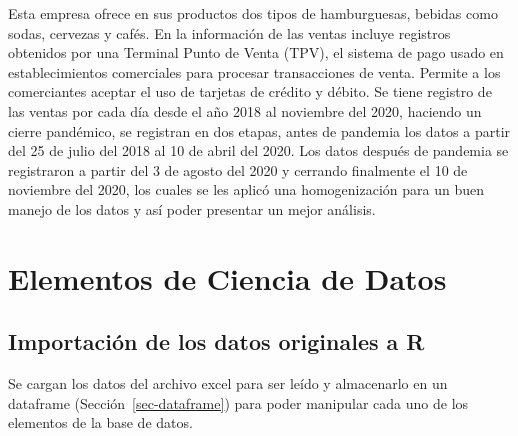 \documentclass[
  us-letterpaper,
]{scrreprt}
\theoremstyle{plain}
\theoremstyle{plain}
\theoremstyle{definition}
\theoremstyle{remark}
\begin{document}
Esta empresa ofrece en sus productos dos tipos de hamburguesas, bebidas
como sodas, cervezas y cafés. En la información de las ventas incluye
registros obtenidos por una Terminal Punto de Venta (TPV), el sistema de
pago usado en establecimientos comerciales para procesar transacciones
de venta. Permite a los comerciantes aceptar el uso de tarjetas de
crédito y débito. Se tiene registro de las ventas por cada día desde el
año 2018 al noviembre del 2020, haciendo un cierre pandémico, se
registran en dos etapas, antes de pandemia los datos a partir del 25 de
julio del 2018 al 10 de abril del 2020. Los datos después de pandemia se
registraron a partir del 3 de agosto del 2020 y cerrando finalmente el
10 de noviembre del 2020, los cuales se les aplicó una homogenización
para un buen manejo de los datos y así poder presentar un mejor
análisis.

\section{Elementos de Ciencia de
Datos}\label{elementos-de-ciencia-de-datos}

\subsection{Importación de los datos originales a
R}\label{importaciuxf3n-de-los-datos-originales-a-r}

Se cargan los datos del archivo excel para ser leído y almacenarlo en un
dataframe (Sección~\ref{sec-dataframe}) para poder manipular cada uno de
los elementos de la base de datos.
\end{document}
